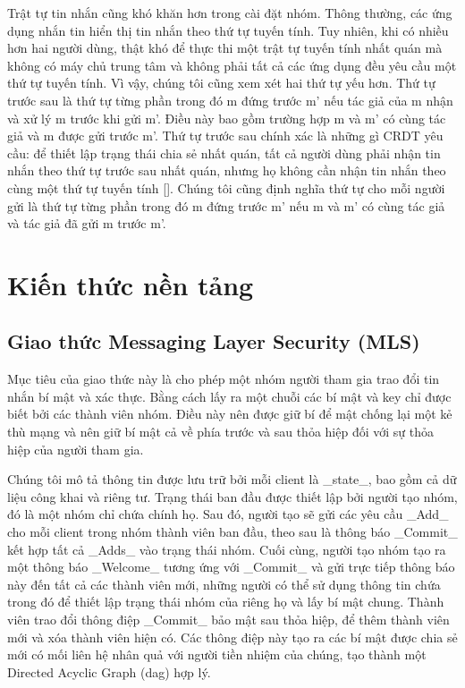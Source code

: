 \documentclass[../main-report.tex]{subfiles}
\begin{document}
Trật tự tin nhắn cũng khó khăn hơn trong cài đặt nhóm. Thông thường, các ứng dụng nhắn tin hiển thị tin nhắn theo thứ tự tuyến tính. Tuy nhiên, khi có nhiều hơn hai người dùng, thật khó để thực thi một trật tự tuyến tính nhất quán mà không có máy chủ trung tâm và không phải tất cả các ứng dụng đều yêu cầu một thứ tự tuyến tính. Vì vậy, chúng tôi cũng xem xét hai thứ tự yếu hơn. Thứ tự trước sau là thứ tự từng phần trong đó m đứng trước m’ nếu tác giả của m nhận và xử lý m trước khi gửi m’. Điều này bao gồm trường hợp m và m’ có cùng tác giả và m được gửi trước m’. Thứ tự trước sau chính xác là những gì CRDT yêu cầu: để thiết lập trạng thái chia sẻ nhất quán, tất cả người dùng phải nhận tin nhắn theo thứ tự trước sau nhất quán, nhưng họ không cần nhận tin nhắn theo cùng một thứ tự tuyến tính [\cite{17}]. Chúng tôi cũng định nghĩa thứ tự cho mỗi người gửi là thứ tự từng phần trong đó m đứng trước m’ nếu m và m’ có cùng tác giả và tác giả đã gửi m trước m’.

\section{Kiến thức nền tảng}
\subsection{Giao thức Messaging Layer Security (MLS)}

Mục tiêu của giao thức này là cho phép một nhóm người tham gia trao đổi tin nhắn bí mật và xác thực. Bằng cách lấy ra một chuỗi các bí mật và \glsdesc{key} chỉ được biết bởi các thành viên nhóm. Điều này nên được giữ bí để mật chống lại một kẻ thù mạng và nên giữ bí mật cả về phía trước và sau thỏa hiệp đối với sự thỏa hiệp của người tham gia.

Chúng tôi mô tả thông tin được lưu trữ bởi mỗi client là \_state\_, bao gồm cả dữ liệu công khai và riêng tư. Trạng thái ban đầu được thiết lập bởi người tạo nhóm, đó là một nhóm chỉ chứa chính họ. Sau đó, người tạo sẽ gửi các yêu cầu \_Add\_ cho mỗi client trong nhóm thành viên ban đầu, theo sau là thông báo \_Commit\_ kết hợp tất cả \_Adds\_ vào trạng thái nhóm. Cuối cùng, người tạo nhóm tạo ra một thông báo \_Welcome\_ tương ứng với \_Commit\_ và gửi trực tiếp thông báo này đến tất cả các thành viên mới, những người có thể sử dụng thông tin chứa trong đó để thiết lập trạng thái nhóm của riêng họ và lấy bí mật chung. Thành viên trao đổi thông điệp \_Commit\_ bảo mật sau thỏa hiệp, để thêm thành viên mới và xóa thành viên hiện có. Các thông điệp này tạo ra các bí mật được chia sẻ mới có mối liên hệ nhân quả với người tiền nhiệm của chúng, tạo thành một \glsdesc{Directed Acyclic Graph} (\acrfull{dag}) hợp lý. 
\end{document}
